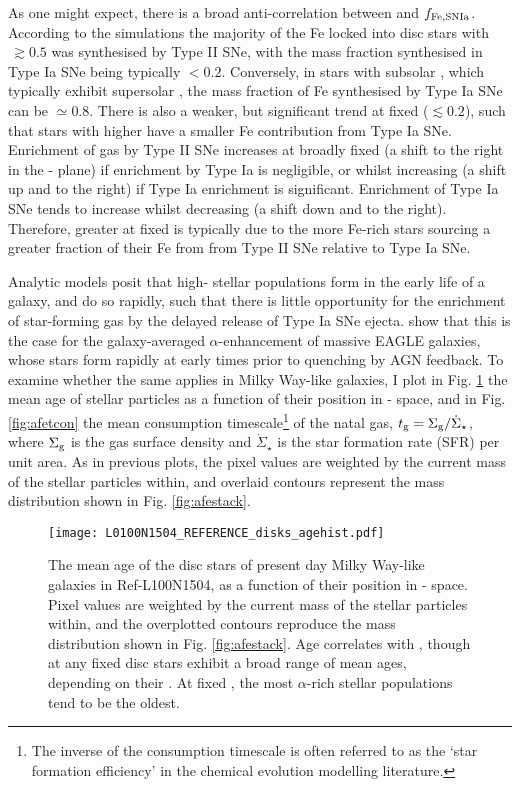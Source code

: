 As one might expect, there is a broad anti-correlation between \afe{} and $f_{\rm Fe,SNIa}$. According to the simulations the majority of the Fe locked into disc stars with \afe{}$\,\gtrsim 0.5$ was synthesised by Type II SNe, with the mass fraction synthesised in Type Ia SNe being typically $< 0.2$. Conversely, in stars with subsolar \afe{}, which typically exhibit supersolar \feh{}, the mass fraction of Fe synthesised by Type Ia SNe can be $\simeq 0.8$. There is also a weaker, but significant trend at fixed \afe{} ($\lesssim 0.2$), such that stars with higher \feh{} have a smaller Fe contribution from Type Ia SNe. Enrichment of gas by Type II SNe increases \feh{} at broadly fixed \afe{} (a shift to the right in the \afe{}-\feh{} plane) if enrichment by Type Ia is negligible, or whilst increasing \afe{} (a shift up and to the right) if Type Ia enrichment is significant. Enrichment of Type Ia SNe tends to increase \feh{} whilst decreasing \afe{} (a shift down and to the right). Therefore, greater \feh{} at fixed \afe{} is typically due to the more Fe-rich stars sourcing a greater fraction of their Fe from from Type II SNe relative to Type Ia SNe. 

Analytic models posit that high-\afe{} stellar populations form in the early life of a galaxy, and do so rapidly, such that there is little opportunity for the enrichment of star-forming gas by the delayed release of Type Ia SNe ejecta. \citet{2016MNRAS.461L.102S} show that this is the case for the galaxy-averaged $\alpha$-enhancement of massive EAGLE galaxies, whose stars form rapidly at early times prior to quenching by AGN feedback. To examine whether the same applies in Milky Way-like galaxies, I plot in Fig. \ref{fig:afeages} the mean age of stellar particles as a function of their position in \afe{}-\feh{} space, and in Fig. \ref{fig:afetcon} the mean consumption timescale\footnote{The inverse of the consumption timescale is often referred to as the `star formation efficiency' in the chemical evolution modelling literature.} of the natal gas, $t_{\rm g} = \Sigma_{\rm g}/\dot{\Sigma}_\star$, where $\Sigma_{\rm g}$ is the gas surface density and $\dot{\Sigma}_\star$ is the star formation rate (SFR) per unit area. As in previous plots, the pixel values are weighted by the current mass of the stellar particles within, and overlaid contours represent the mass distribution shown in Fig. \ref{fig:afestack}. 

\begin{figure}
\texttt{[image: L0100N1504\_REFERENCE\_disks\_agehist.pdf]}
\caption[Mean stellar age as a function of \afe{} and \feh{} for disk stars in Ref-L100N1504]{\label{fig:afeages} The mean age of the disc stars of present day Milky Way-like galaxies in Ref-L100N1504, as a function of their position in \afe{}-\feh{} space. Pixel values are weighted by the current mass of the stellar particles within, and the overplotted contours reproduce the mass distribution shown in Fig. \ref{fig:afestack}. Age correlates with \afe{}, though at any fixed \afe{} disc stars exhibit a broad range of mean ages, depending on their \feh{}. At fixed \feh{}, the most $\alpha$-rich stellar populations tend to be the oldest.}
\end{figure}

